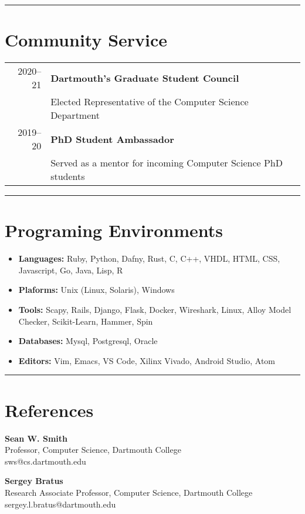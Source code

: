 \documentclass[letterpaper,10pt]{article}
\begin{document}
\vspace{0.5cm}

\hrule

\section*{\color{dartmouthgreen} Community Service}
  \begin{tabular}{r l}
   2020--21 & \textbf{Dartmouth's Graduate Student Council}  \\
            &  Elected Representative of the Computer Science Department \\
  2019--20 & \textbf{PhD Student Ambassador} \\
           &   Served as a mentor for incoming Computer Science PhD students \\
  \end{tabular}

\vspace{0.5cm}
\hrule


\section*{\color{dartmouthgreen} Programing Environments}
\setlength\itemsep{0ex}
  \begin {itemize}
\setlength\itemsep{0ex}
\item \textbf{\color{dartmouthgreen}Languages:} Ruby, Python, Dafny, Rust, C, C++, VHDL, HTML, CSS, Javascript, Go, Java, Lisp, R
\item \textbf{\color{dartmouthgreen}Plaforms:} Unix (Linux, Solaris), Windows
\item \textbf{\color{dartmouthgreen}Tools:} Scapy, Rails, Django, Flask, Docker, Wireshark, Linux, Alloy Model Checker, Scikit-Learn, Hammer, Spin
\item \textbf{\color{dartmouthgreen}Databases:} Mysql, Postgresql, Oracle
        \item \textbf{\color{dartmouthgreen}Editors:} Vim, Emacs, VS Code, Xilinx Vivado, Android Studio, Atom
\end{itemize}

\hrule

\section*{\color{dartmouthgreen} References}

\textbf{Sean W. Smith}\\
Professor, Computer Science, Dartmouth College\\
{\color{dartmouthgreencompl} sws@cs.dartmouth.edu}
\vspace{0.5cm}

\textbf{Sergey Bratus}\\
Research Associate Professor, Computer Science, Dartmouth College\\
{\color{dartmouthgreencompl} sergey.l.bratus@dartmouth.edu}\\\\
\end{document}
